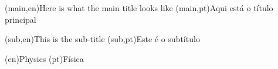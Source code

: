 
%




%
%
%
%
\nttitle(main,en){Here is what the main title looks like}%
\nttitle(main,pt){Aqui está o título principal}%

\nttitle(sub,en){This is the sub-title}%
\nttitle(sub,pt){Este é o subtítulo}%



%
%
%
%
\ntdepartment(en){Physics} %
\ntdepartment(pt){Física}   %



